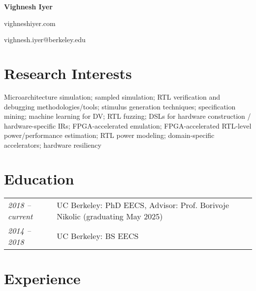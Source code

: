 \documentclass[10pt]{article}
\begin{document}
\begin{center}
    {\LARGE \textbf{Vighnesh Iyer}}

    {\small vighneshiyer.com}

    {\small vighnesh.iyer@berkeley.edu}
\end{center}

\section{Research Interests}
\vspace{-0.1cm}
{Microarchitecture simulation; sampled simulation; RTL verification and debugging methodologies/tools; stimulus generation techniques; specification mining; machine learning for DV; RTL fuzzing; DSLs for hardware construction / hardware-specific IRs; FPGA-accelerated emulation; FPGA-accelerated RTL-level power/performance estimation; RTL power modeling; domain-specific accelerators; hardware resiliency}
\vspace{-0.2cm}

\section{Education}
\vspace{-0.1cm}
\begin{tabular}{@{}ll}
    \textit{2018 -- current} & UC Berkeley: PhD EECS, Advisor: Prof. Borivoje Nikolic (graduating May 2025)\\
    \textit{2014 -- 2018} & UC Berkeley: BS EECS
\end{tabular}
\vspace{-0.2cm}

\section{Experience}
\end{document}
